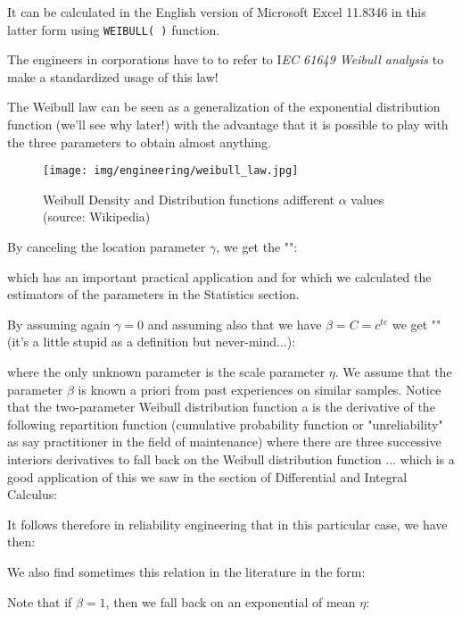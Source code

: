 	It can be calculated in the English version of Microsoft Excel 11.8346 in this latter form using \texttt{WEIBULL( )} function.
	\begin{tcolorbox}[title=Remark,colframe=black,arc=10pt]
	The engineers in corporations have to to refer to I\textit{EC 61649 Weibull analysis} to make a standardized usage of this law!
	\end{tcolorbox}
	The Weibull law can be seen as a generalization of the exponential distribution function (we'll see why later!) with the advantage that it is possible to play with the three parameters to obtain almost anything.
	\begin{figure}[H]
		\begin{center}
			\texttt{[image: img/engineering/weibull\_law.jpg]}
		\end{center}	
		\caption{Weibull Density and Distribution functions adifferent $\alpha$ values (source: Wikipedia)}
	\end{figure}
	By canceling the location parameter $\gamma$, we get the "":
	
	which has an important practical application and for which we calculated the estimators of the parameters in the Statistics section.
	
	By assuming again $\gamma=0$ and assuming also that we have $\beta=C=c^{te}$ we get "" (it's a little stupid as a definition but never-mind...):
	
	where the only unknown parameter is the scale parameter $\eta$. We assume that the parameter $\beta$ is known a priori from past experiences on similar samples. Notice that the two-parameter Weibull distribution function a is the derivative of the following repartition function (cumulative probability function or "unreliability" as say practitioner in the field of maintenance) where there are three successive interiors derivatives to fall back on the Weibull distribution function ... which is a good application of this we saw in the section of Differential and Integral Calculus:
	
	It follows therefore in reliability engineering that in this particular case, we have then:
	
	We also find sometimes this relation in the literature in the form:
	
	Note that if $\beta=1$, then we fall back on an exponential of mean $\eta$:
	
